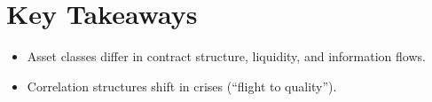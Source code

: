 \section*{Key Takeaways}
\begin{itemize}
  \item Asset classes differ in contract structure, liquidity, and
        information flows.
  \item Correlation structures shift in crises (“flight to quality”).
\end{itemize}
